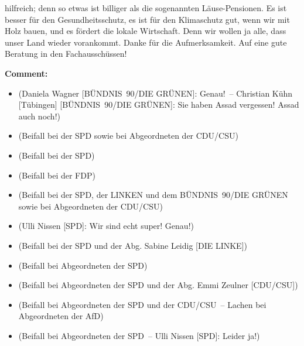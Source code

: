 \documentclass{article}
\begin{document}
hilfreich; denn so etwas ist billiger als die sogenannten Läuse-Pensionen. Es ist besser für den Gesundheitsschutz, es ist für den Klimaschutz gut, wenn wir mit Holz bauen, und es fördert die lokale Wirtschaft. Denn wir wollen ja alle, dass unser Land wieder vorankommt. Danke für die Aufmerksamkeit. Auf eine gute Beratung in den Fachausschüssen!  

\noindent\textbf{Comment:}
\begin{itemize}
    \setlength\itemsep{-3pt}
    \item (Daniela Wagner [BÜNDNIS 90/DIE GRÜNEN]: Genau! – Christian Kühn [Tübingen] [BÜNDNIS 90/DIE GRÜNEN]: Sie haben Assad vergessen! Assad auch noch!)
    \setlength\itemsep{-3pt}
    \item (Beifall bei der SPD sowie bei Abgeordneten der CDU/CSU)
    \setlength\itemsep{-3pt}
    \item (Beifall bei der SPD)
    \setlength\itemsep{-3pt}
    \item (Beifall bei der FDP)
    \setlength\itemsep{-3pt}
    \item (Beifall bei der SPD, der LINKEN und dem BÜNDNIS 90/DIE GRÜNEN sowie bei Abgeordneten der CDU/CSU)
    \setlength\itemsep{-3pt}
    \item (Ulli Nissen [SPD]: Wir sind echt super! Genau!)
    \setlength\itemsep{-3pt}
    \item (Beifall bei der SPD und der Abg. Sabine Leidig [DIE LINKE])
    \setlength\itemsep{-3pt}
    \item (Beifall bei Abgeordneten der SPD)
    \setlength\itemsep{-3pt}
    \item (Beifall bei Abgeordneten der SPD und der Abg. Emmi Zeulner [CDU/CSU])
    \setlength\itemsep{-3pt}
    \item (Beifall bei Abgeordneten der SPD und der CDU/CSU – Lachen bei Abgeordneten der AfD)
    \setlength\itemsep{-3pt}
    \item (Beifall bei Abgeordneten der SPD – Ulli Nissen [SPD]: Leider ja!)
\end{itemize}
\end{document}
